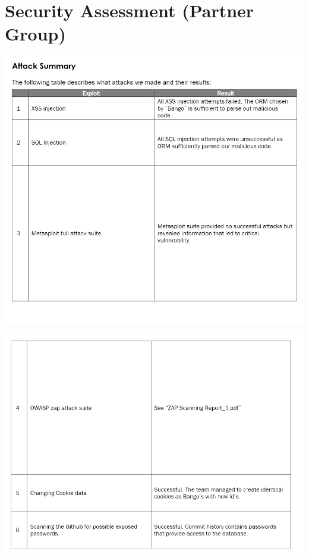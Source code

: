 \section{Security Assessment (Partner Group)}
\label{appendix:securityAssessment}

\includegraphics[width=1\textwidth]{images/Attack P1.png}

\includegraphics[width=1\textwidth]{images/Attack P2.png}


